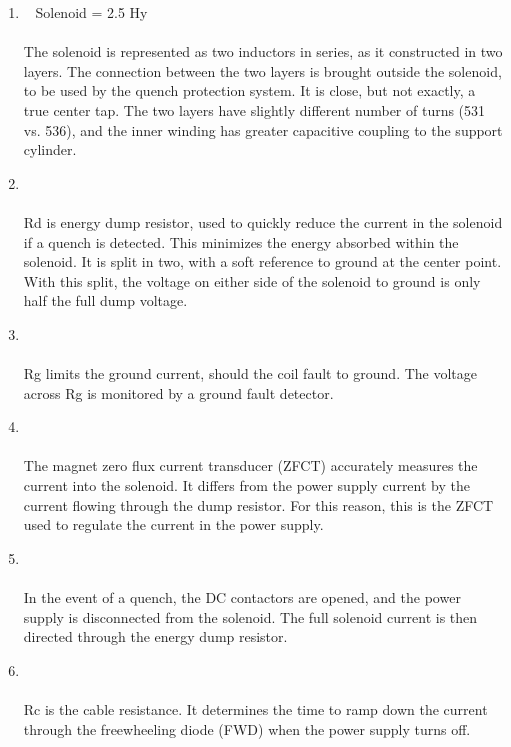 \renewcommand{\theenumi}{\Alph{enumi}}
\begin{enumerate}
\item {~{  Solenoid}{  = 2.5}{  Hy}\\
\\
{ The solenoid is represented as two inductors in series, as it constructed in two layers.  The connection between the two layers is brought outside the solenoid, to be used by the quench protection system.  It is close, but not exactly, a true center tap.  The two layers have slightly different number of turns (531 vs. 536), and the inner winding has greater capacitive coupling to the }{ support cylinder. }{ }}

\item {\\
\\
{Rd is energy dump resistor, used to quickly reduce the current in the solenoid if a quench is detected.  This minimizes the energy absorbed within the solenoid.  It is split in two, with a soft reference to ground at the center point.}{   With this split, the voltage on either side of the solenoid to ground is only half the full dump voltage. }{ }}

\item { \\
\\
{ Rg limits the ground current, should the coil fault to ground.  The voltage across Rg is monitored by a ground fault detector.}{ }}

\item { \\
\\{ The magnet zero flux current transducer (ZFCT)  accurately measures the current into the solenoid.  It differs from the power supply current by the current flowing through the dump resistor.  For this reason, this is the ZFCT used to regulate the current in the power supply.}{ }}

\item {\\
\\
{ In the event of a quench, the DC contactors are opened, and the power supply is disconnected from the solenoid.  The full solenoid current is then directed through the energy dump resistor. }{ }}

\item {\\
\\
{ Rc is the cable resistance.  It determines the time to ramp down the }{ current through}{  the freewheeling diode (FWD) when the power supply turns off.}{ }}


\end{enumerate}
